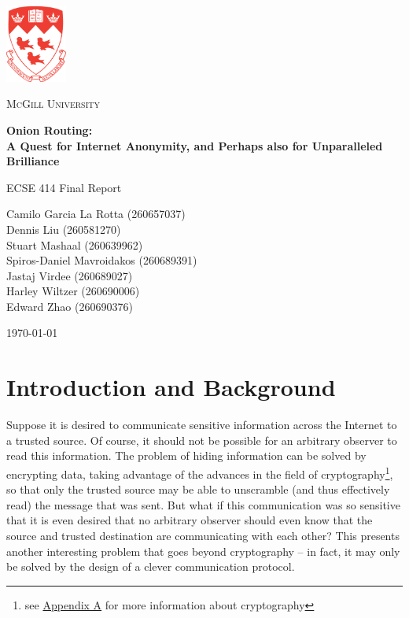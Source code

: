 \documentclass[10pt]{report}
\begin{document}
\begin{titlepage}
    \begin{center}
        \includegraphics[width=0.15\textwidth]{McGill.pdf}~\par\vspace{1cm}
        {\scshape\LARGE McGill University \par}
        \vspace{1cm}
        {\huge\bfseries Onion Routing:\\A Quest for Internet Anonymity, and Perhaps also for Unparalleled Brilliance\par}
        \vspace{1.5cm}
        {\Large ECSE 414 Final Report\par}
        \vspace{2cm}
        {\Large Camilo Garcia La Rotta (260657037)\\}
        {\Large Dennis Liu (260581270)\\}
        {\Large Stuart Mashaal (260639962)\\}
        {\Large Spiros-Daniel Mavroidakos (260689391)\\}
        {\Large Jastaj Virdee (260689027)\\}
        {\Large Harley Wiltzer (260690006)\\}
        {\Large Edward Zhao (260690376)\\}
        \vfill
        {\large \today\par}
    \end{center}
\end{titlepage}

\tableofcontents

{}

\chapter{Introduction and Background}
Suppose it is desired to communicate sensitive information across the Internet to a trusted source.
Of course, it should not be possible for an arbitrary observer to read this information. The problem
of hiding information can be solved by encrypting data, taking advantage of the advances in the
field of cryptography\footnote{see \hyperref[crypto]{Appendix A} for more information about
cryptography}, so that only the trusted source may be able to unscramble (and thus
effectively read) the message that was sent. But what if this communication was so sensitive that it
is even desired that no arbitrary observer should even know that the source and trusted destination
are communicating with each other? This presents another interesting problem that goes beyond
cryptography -- in fact, it may only be solved by the design of a clever communication protocol.\\
\end{document}
